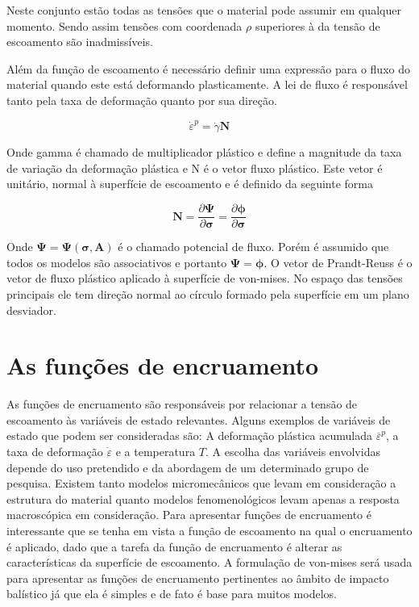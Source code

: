 Neste conjunto estão todas as tensões que o material pode assumir em qualquer momento. Sendo assim tensões com coordenada $\rho$ superiores à da tensão de escoamento são inadmissíveis. \par

Além da função de escoamento é necessário definir uma expressão para o fluxo do material quando este está deformando plasticamente. A lei de fluxo é responsável tanto pela taxa de deformação quanto por sua direção.

\begin{equation}
    \dot{\varepsilon}^p = \dot{\gamma} \boldsymbol{N}
\end{equation}

Onde \gls{gamma} é chamado de multiplicador plástico e  define a magnitude da taxa de variação da deformação plástica e \gls{N} é o vetor fluxo plástico. Este vetor é unitário, normal à superfície de escoamento e é definido da seguinte forma

\begin{equation}
    \boldsymbol{N} = \frac{\partial \boldsymbol{\Psi}}{\partial \boldsymbol{\sigma}} = \frac{\partial \boldsymbol{\phi}}{\partial \boldsymbol{\sigma}}
\end{equation}

Onde $\boldsymbol{\Psi} = \boldsymbol{\Psi}(\boldsymbol{\sigma}, \boldsymbol{A}) $ é o chamado potencial de fluxo. Porém é assumido que todos os modelos são associativos e portanto $ \boldsymbol{\Psi} = \boldsymbol{\phi} $. O vetor de Prandt-Reuss é o vetor de fluxo plástico aplicado à superfície de von-mises. No espaço das tensões principais ele tem direção normal ao círculo formado pela superfície em um plano desviador.

\section{As funções de encruamento}

As funções de encruamento são responsáveis por relacionar a tensão de escoamento às variáveis de estado relevantes. Alguns exemplos de variáveis de estado que podem ser consideradas são: A deformação plástica acumulada $ \overline{\varepsilon}^p $, a taxa de deformação $ \dot{\varepsilon} $ e a temperatura $ T $. A escolha das variáveis envolvidas depende do uso pretendido e da abordagem de um determinado grupo de pesquisa. Existem tanto modelos micromecânicos que levam em consideração a estrutura do material quanto modelos fenomenológicos levam apenas a resposta macroscópica em consideração. Para apresentar funções de encruamento é interessante que se tenha em vista a função de escoamento na qual o encruamento é aplicado, dado que a tarefa da função de encruamento é alterar as características da superfície de escoamento. A formulação de von-mises será usada para apresentar as funções de encruamento pertinentes ao âmbito de impacto balístico já que ela é simples e de fato é base para muitos modelos. \\


